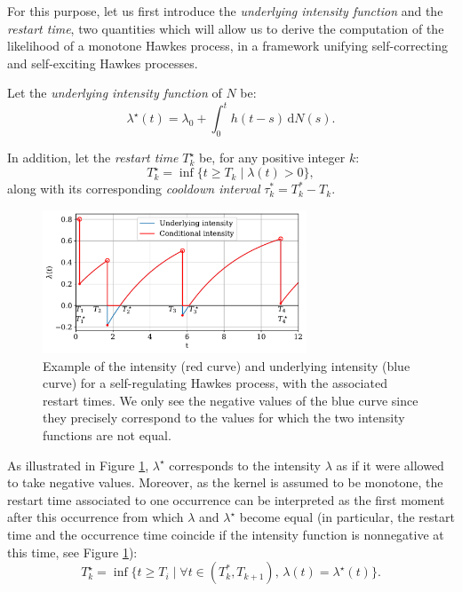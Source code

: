 For this purpose, let us first introduce the \emph{underlying intensity function} and the \emph{restart time}, two quantities which will allow us to
derive the computation of the likelihood of a monotone Hawkes process, in a framework unifying self-correcting and self-exciting Hawkes processes.

\begin{definition}
Let the \emph{underlying intensity function} of $N$ be:
\begin{equation*}
    \lambda^\star(t) = \lambda_0 + \int_{0}^{t}{h(t-s)\,\mathrm{d}N(s)}.
\end{equation*}

In addition, let the \emph{restart time} $T_k^\star$ be, for any positive integer $k$:
\begin{equation*}
    T_k^\star = \inf{\{t\geq T_k\mid \lambda(t) > 0\}},
\end{equation*}
along with its corresponding \emph{cooldown interval} $\tau_k^* = T_k^* - T_k$.
\label{def:chap1_underlying}
\end{definition}

\begin{figure}[!ht]
  \centering
  \includegraphics[width=0.7\textwidth]{images/chapter2/cooldownTimesMarkedSerif2.pdf}  %
  \caption{Example of the intensity (red curve) and underlying intensity (blue curve) for a self-regulating Hawkes process, with the associated restart times. We only see the negative values of the blue curve since they precisely correspond to the values for which the two intensity functions are not equal.
  }
  \label{fig:chap1_underlying_intensity}
\end{figure}

As illustrated in Figure \ref{fig:chap1_underlying_intensity}, $\lambda^\star$ corresponds to the intensity $\lambda$ as if it were allowed to take negative values.
Moreover, as the kernel is assumed to be monotone, the restart time associated to one occurrence can be interpreted as the first moment after this occurrence from which $\lambda$ and $\lambda^\star$ become equal  (in particular, the restart time and the occurrence time coincide if the intensity function is nonnegative at this time, see Figure \ref{fig:chap1_underlying_intensity}):
\begin{equation*}
    T_k^\star = \inf{\{t\geq T_i\mid \forall t\in(T_k^*,T_{k+1}),\, \lambda(t) = \lambda^\star(t)\}}.
\end{equation*}

